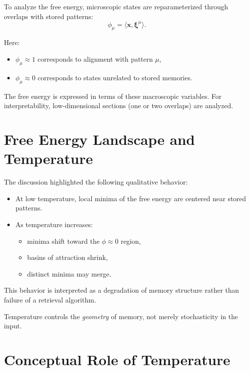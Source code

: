\documentclass[11pt,a4paper]{article}
\begin{document}
To analyze the free energy, microscopic states are reparameterized through overlaps with stored patterns:
\[
\phi_\mu = \langle \bm{x}, \bm{\xi}^\mu \rangle.
\]

Here:
\begin{itemize}
    \item $\phi_\mu \approx 1$ corresponds to alignment with pattern $\mu$,
    \item $\phi_\mu \approx 0$ corresponds to states unrelated to stored memories.
\end{itemize}

The free energy is expressed in terms of these macroscopic variables. For interpretability, low-dimensional sections (one or two overlaps) are analyzed.

\section{Free Energy Landscape and Temperature}

The discussion highlighted the following qualitative behavior:

\begin{itemize}
    \item At low temperature, local minima of the free energy are centered near stored patterns.
    \item As temperature increases:
    \begin{itemize}
        \item minima shift toward the $\phi \approx 0$ region,
        \item basins of attraction shrink,
        \item distinct minima may merge.
    \end{itemize}
\end{itemize}

This behavior is interpreted as a degradation of memory structure rather than failure of a retrieval algorithm.

Temperature controls the \emph{geometry} of memory, not merely stochasticity in the input.

\section{Conceptual Role of Temperature}
\end{document}
